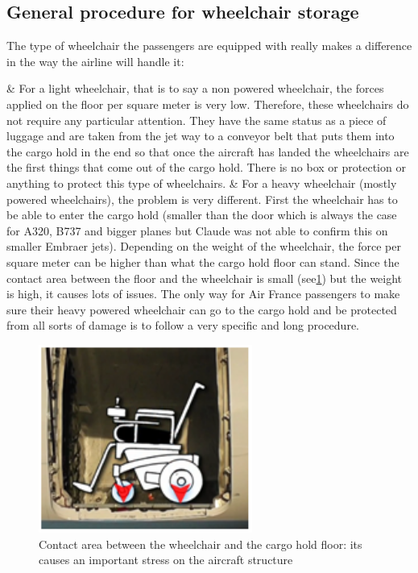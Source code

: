 \subsection{General procedure for wheelchair storage}
The type of wheelchair the passengers are equipped with really makes a difference in the way the airline will handle it:
\begin{easylist}[itemize]
& For a light wheelchair, that is to say a non powered wheelchair, the forces applied on the floor per square meter is very low. Therefore, these wheelchairs do not require any particular attention. They have the same status as a piece of luggage and are taken from the jet way to a conveyor belt that puts them into the cargo hold in the end so that once the aircraft has landed the wheelchairs are the first things that come out of the cargo hold. There is no box or protection or anything to protect this type of wheelchairs.
& For a heavy wheelchair (mostly powered wheelchairs), the problem is very different. First the wheelchair has to be able to enter the cargo hold (smaller than the door which is always the case for A320, B737 and bigger planes but Claude was not able to confirm this on smaller Embraer jets). Depending on the weight of the wheelchair, the force per square meter can be higher than what the cargo hold floor can stand. Since the contact area between the floor and the wheelchair is small (see\ref{fig:wheelchair_contact_area}) but the weight is high, it causes lots of issues. The only way for Air France passengers to make sure their heavy powered wheelchair can go to the cargo hold and be protected from all sorts of damage is to follow a very specific and long procedure.
\end{easylist}
\begin{figure}[h]
\centering
\includegraphics[width=7cm]{images/wheelchair_contact_area}
\caption{Contact area between the wheelchair and the cargo hold floor: its causes an important stress on the aircraft structure}
\label{fig:wheelchair_contact_area}
\end{figure}

